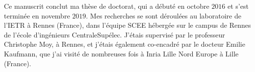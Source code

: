 \begin{resume_fr}



Ce manuscrit conclut ma thèse de doctorat, qui a débuté en octobre $2016$ et s'est terminée en novembre $2019$.
Mes recherches se sont déroulées au laboratoire de l'IETR à Rennes (France), dans l'équipe SCEE hébergée sur le campus de Rennes de l'école d'ingénieurs CentraleSupélec.
J'étais supervisé par le professeur Christophe Moy, à Rennes,
et j'étais également co-encadré par le docteur Emilie Kaufmann, que j'ai visité de nombreuses fois à Inria Lille Nord Europe à Lille (France).





\end{resume_fr}
